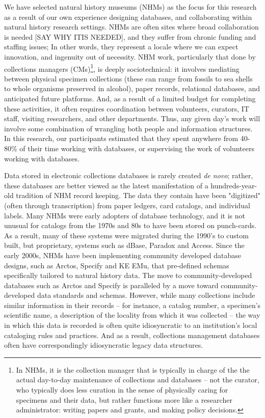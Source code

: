 We have selected natural history museums (NHMs) as the focus for this research as a result of our own experience designing databases, and collaborating within natural history research settings. NHMs are often sites where broad collaboration is needed [SAY WHY ITIS NEEDED], and they suffer from chronic funding and staffing issues; In other words,  they represent a locale where we can expect innovation, and ingenuity out of necessity. NHM work, particularly that done by collections managers (CMs)\footnote{In NHMs, it is the collection manager that is typically in charge of the the actual day-to-day maintenance of collections and databases -- not the curator, who typically does less curation in the sense of physically caring for specimens and their data, but rather functions more like a researcher administrator: writing papers and grants, and making policy decisions.}, is deeply sociotechnical: it involves mediating between physical specimen collections (these can range from fossils to sea shells to whole organisms preserved in alcohol), paper records, relational databases, and anticipated future platforms. And, as a result of a limited budget for completing these activities, it often requires coordination between volunteers, curators, IT staff, visiting researchers, and other departments. Thus, any given day’s work will involve some combination of wrangling both people and information structures. In this research, our participants estimated that they spent anywhere from 40-80\% of their time working with databases, or supervising the work of volunteers working with databases.

Data stored in electronic collections databases is rarely created \textit{de novo}; rather, these databases are better viewed as the latest manifestation of a hundreds-year-old tradition of NHM record keeping. The data they contain have been "digitized" (often through transcription) from paper ledgers, card catalogs, and individual labels. Many NHMs were early adopters of database technology, and it is not unusual for catalogs from the 1970s and 80s to have been stored on punch-cards. As a result, many of these systems were migrated during the 1990's to custom built, but proprietary, systems such as dBase, Paradox and Access. Since the early 2000s, NHMs have been implementing community developed database designs, such as Arctos, Specify and KE EMu, that pre-defined schemas specifically tailored to natural history data. The move to community-developed databases such as Arctos and Specify is paralleled by a move toward community-developed data standards and schemas.  However, while many collections include similar information in their records – for instance, a catalog number, a specimen’s scientific name, a description of the locality from which it was collected – the way in which this data is recorded is often quite idiosyncratic to an institution’s local cataloging rules and practices. And as a result, collections management databases often have correspondingly idiosyncratic legacy data structures.

